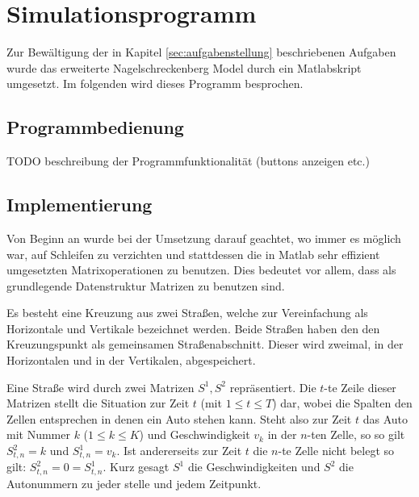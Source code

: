 \chapter{Simulationsprogramm}
Zur Bewältigung der in Kapitel \ref{sec:aufgabenstellung} beschriebenen
Aufgaben wurde das erweiterte Nagelschreckenberg Model 
durch ein Matlabskript umgesetzt. Im folgenden wird dieses
Programm besprochen.

\section{Programmbedienung}
TODO beschreibung der Programmfunktionalität (buttons anzeigen etc.)

\section{Implementierung}
Von Beginn an wurde bei der Umsetzung darauf geachtet, wo immer es möglich 
war, auf Schleifen zu verzichten und stattdessen die in Matlab sehr effizient 
umgesetzten Matrixoperationen zu benutzen. Dies bedeutet vor allem, dass als 
grundlegende Datenstruktur Matrizen zu benutzen sind. 

Es besteht eine Kreuzung aus zwei Straßen, welche zur Vereinfachung als Horizontale und Vertikale
bezeichnet werden. Beide Straßen haben den den Kreuzungspunkt als gemeinsamen Straßenabschnitt. Dieser
wird zweimal, in der Horizontalen und in der Vertikalen, abgespeichert.

Eine Straße wird durch zwei Matrizen \(S^{1}, S^{2}\) repräsentiert. 
Die \(t\)-te Zeile dieser Matrizen stellt die Situation zur Zeit \(t\) (mit \(1 \leq t \leq T\)) dar, 
wobei die Spalten den Zellen entsprechen in denen ein Auto stehen kann. 
Steht also zur Zeit \(t\) das Auto mit Nummer \(k\) (\(1 \leq k \leq K\)) und Geschwindigkeit \(v_k\) in der \(n\)-ten Zelle, 
so so gilt \( S^{2}_{t, n} = k\) und \(S^{1}_{t, n} = v_k\). 
Ist andererseits zur Zeit \(t\) die \(n\)-te Zelle nicht belegt so gilt: \(S^2_{t, n} = 0 = S^1_{t, n}\).
Kurz gesagt \(S^{1}\) die Geschwindigkeiten und \(S^{2}\) die Autonummern zu jeder stelle und jedem Zeitpunkt.
